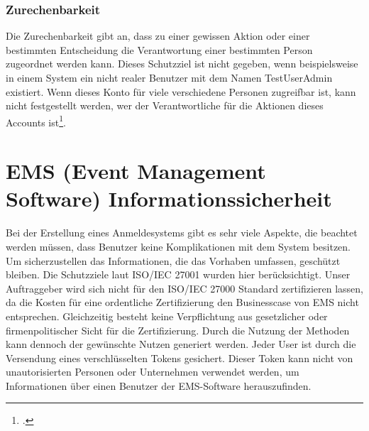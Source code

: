 \subsubsection{Zurechenbarkeit}
Die Zurechenbarkeit gibt an, dass zu einer gewissen Aktion oder einer bestimmten Entscheidung die Verantwortung einer bestimmten Person zugeordnet werden kann. Dieses Schutzziel ist nicht gegeben, wenn beispielsweise in einem System ein nicht realer Benutzer mit dem Namen TestUserAdmin existiert. Wenn dieses Konto für viele verschiedene Personen zugreifbar ist, kann nicht festgestellt werden, wer der Verantwortliche für die Aktionen dieses Accounts ist\footcite{Lehrunterlagen-HTL-cloud}.

\section{EMS (Event Management Software) Informationssicherheit}
Bei der Erstellung eines Anmeldesystems gibt es sehr viele Aspekte, die beachtet werden müssen, dass Benutzer keine Komplikationen mit dem System besitzen. Um sicherzustellen das Informationen, die das Vorhaben umfassen, geschützt bleiben. Die Schutzziele laut ISO/IEC 27001 wurden hier berücksichtigt. Unser Auftraggeber wird sich nicht für den ISO/IEC 27000 Standard zertifizieren lassen, da die Kosten für eine ordentliche Zertifizierung den Businesscase von EMS nicht entsprechen. Gleichzeitig besteht keine Verpflichtung aus gesetzlicher oder firmenpolitischer Sicht für die Zertifizierung. Durch die Nutzung der Methoden kann dennoch der gewünschte Nutzen generiert werden.
Jeder User ist durch die Versendung eines verschlüsselten Tokens gesichert. Dieser Token kann nicht von unautorisierten Personen oder Unternehmen verwendet werden, um Informationen über einen Benutzer der EMS-Software herauszufinden. 

